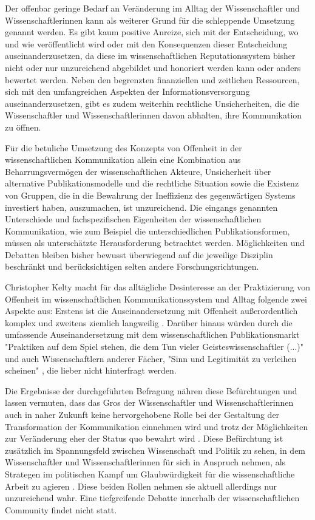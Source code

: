 Der offenbar geringe Bedarf an Veränderung im Alltag der Wissenschaftler und Wissenschaftlerinnen kann als weiterer Grund für die schleppende Umsetzung genannt werden. Es gibt kaum positive Anreize, sich mit der Entscheidung, wo und wie veröffentlicht wird oder mit den Konsequenzen dieser Entscheidung auseinanderzusetzen, da diese im wissenschaftlichen Reputationssystem bisher nicht oder nur unzureichend abgebildet und honoriert werden kann oder anders bewertet werden. Neben den begrenzten finanziellen und zeitlichen Ressourcen, sich mit den umfangreichen Aspekten der Informationsversorgung auseinanderzusetzen, gibt es zudem weiterhin rechtliche Unsicherheiten, die die Wissenschaftler und Wissenschaftlerinnen davon abhalten, ihre Kommunikation zu öffnen.

Für die betuliche Umsetzung des Konzepts von Offenheit in der wissenschaftlichen Kommunikation allein eine Kombination aus Beharrungsvermögen der wissenschaftlichen Akteure, Unsicherheit über alternative Publikationsmodelle und die rechtliche Situation sowie die Existenz von Gruppen, die in die Bewahrung der Ineffizienz des gegenwärtigen Systems investiert haben, auszumachen, ist unzureichend. Die eingangs genannten Unterschiede und fachspezifischen Eigenheiten der wissenschaftlichen Kommunikation, wie zum Beispiel die unterschiedlichen Publikationsformen, müssen als unterschätzte Herausforderung betrachtet werden. Möglichkeiten und Debatten bleiben bisher bewusst überwiegend auf die jeweilige Disziplin beschränkt und berücksichtigen selten andere Forschungsrichtungen.

Christopher Kelty macht für das alltägliche Desinteresse an der Praktizierung von Offenheit im wissenschaftlichen Kommunikationssystem und Alltag folgende zwei Aspekte aus: Erstens ist die Auseinandersetzung mit Offenheit außerordentlich komplex und zweitens ziemlich langweilig \cite[:203]{Kelty_2014a}. Darüber hinaus würden durch die umfassende Auseinandersetzung mit dem wissenschaftlichen Publikationsmarkt "Praktiken auf dem Spiel stehen, die dem Tun vieler Geisteswissenschaftler (...)" und auch Wissenschaftlern anderer Fächer, "Sinn und Legitimität zu verleihen scheinen" \cite[:6]{Hirschi_2015}, die lieber nicht hinterfragt werden.

Die Ergebnisse der durchgeführten Befragung nähren diese Befürchtungen und lassen vermuten, dass das Gros der Wissenschaftler und Wissenschaftlerinnen auch in naher Zukunft keine hervorgehobene Rolle bei der Gestaltung der Transformation der Kommunikation einnehmen wird und trotz der Möglichkeiten zur Veränderung eher der Status quo bewahrt wird \cite{Nosek_2012}. Diese Befürchtung ist zusätzlich im Spannungsfeld zwischen Wissenschaft und Politik zu sehen, in dem Wissenschaftler und Wissenschaftlerinnen für sich in Anspruch nehmen, als Strategen im politischen Kampf um Glaubwürdigkeit für die wissenschaftliche Arbeit zu agieren \cite{Latour_2013}. Diese beiden Rollen nehmen sie aktuell allerdings nur unzureichend wahr. Eine tiefgreifende Debatte innerhalb der wissenschaftlichen Community findet nicht statt.

